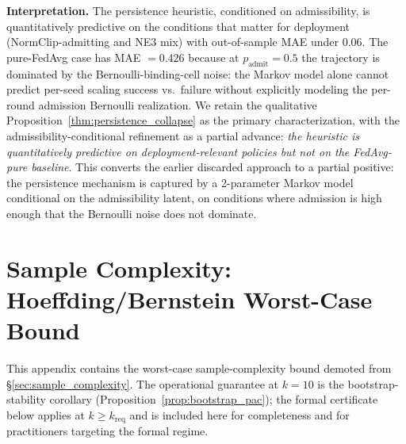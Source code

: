 \documentclass{article}
\begin{document}
\textbf{Interpretation.} The persistence heuristic, conditioned on admissibility, is quantitatively predictive on the conditions that matter for deployment (NormClip-admitting and NE3 mix) with out-of-sample MAE under $0.06$. The pure-FedAvg case has MAE $= 0.426$ because at $p_{\mathrm{admit}}=0.5$ the trajectory is dominated by the Bernoulli-binding-cell noise: the Markov model alone cannot predict per-seed scaling success vs.\ failure without explicitly modeling the per-round admission Bernoulli realization. We retain the qualitative Proposition~\ref{thm:persistence_collapse} as the primary characterization, with the admissibility-conditional refinement as a partial advance: \emph{the heuristic is quantitatively predictive on deployment-relevant policies but not on the FedAvg-pure baseline}. This converts the earlier discarded approach to a partial positive: the persistence mechanism is captured by a 2-parameter Markov model conditional on the admissibility latent, on conditions where admission is high enough that the Bernoulli noise does not dominate.

\section{Sample Complexity: Hoeffding/Bernstein Worst-Case Bound}
\label{app:sample_complexity_caveat}

This appendix contains the worst-case sample-complexity bound demoted from §\ref{sec:sample_complexity}. The operational guarantee at $k=10$ is the bootstrap-stability corollary (Proposition~\ref{prop:bootstrap_pac}); the formal certificate below applies at $k \geq k_{\mathrm{req}}$ and is included here for completeness and for practitioners targeting the formal regime.
\end{document}
